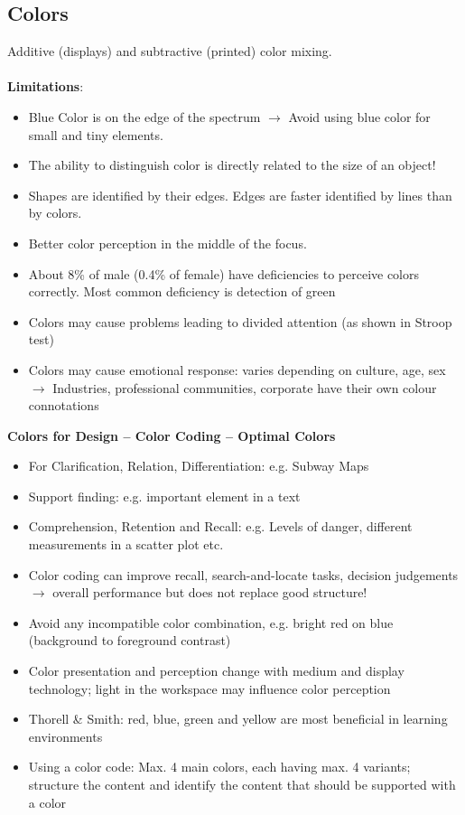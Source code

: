 \subsection{Colors}
Additive (displays) and subtractive (printed) color mixing.\\\\
\textbf{Limitations}: 
\begin{itemize}
\item Blue Color is on the edge of the spectrum $\rightarrow$ Avoid using blue color for small and tiny elements.
\item The ability to distinguish color is directly related to the size of an object!
\item Shapes are identified by their edges. Edges are faster identified by lines than by colors.
\item Better color perception in the middle of the focus.
\item About 8\% of male (0.4\% of female) have deficiencies to perceive colors correctly. Most common deficiency is detection of green
\item Colors may cause problems leading to divided attention (as shown in Stroop test)
\item Colors may cause emotional response: varies depending on culture, age, sex $\rightarrow$ Industries, professional communities, corporate have their own colour connotations
\end{itemize}
\textbf{Colors for Design -- Color Coding -- Optimal Colors}
\begin{itemize}
\item For Clarification, Relation, Differentiation: e.g. Subway Maps
\item Support finding: e.g. important element in a text
\item Comprehension, Retention and Recall: e.g. Levels of danger, different measurements in a scatter plot etc.
\item Color coding can improve recall, search-and-locate tasks, decision judgements $\rightarrow$ overall performance but does not replace good structure!
\item Avoid any incompatible color combination, e.g. bright red on blue (background to foreground contrast)
\item Color presentation and perception change with medium and display technology; light in the workspace may influence color perception
\item Thorell \& Smith: red, blue, green and yellow are most beneficial in learning environments
\item Using a color code: Max. 4 main colors, each having max. 4 variants; structure the content and identify the content that should be supported with a color
\end{itemize}

